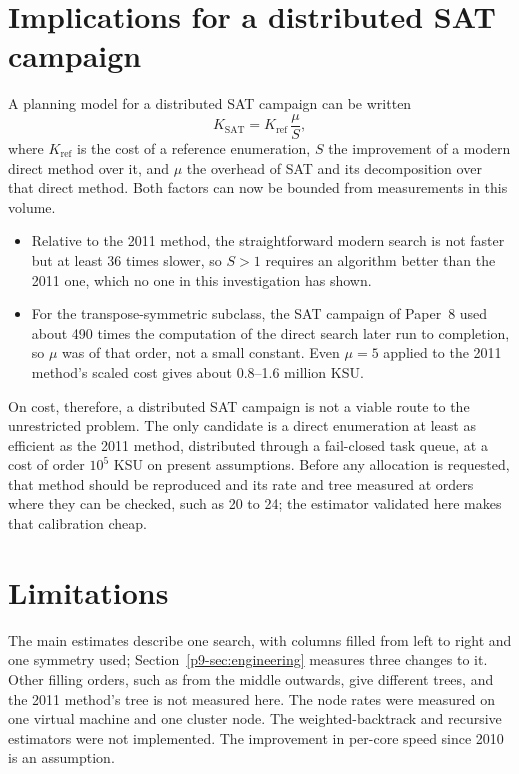 \documentclass[11pt,a4paper,oneside]{report}
\theoremstyle{definition}
\begin{document}
\section{Implications for a distributed SAT campaign}
\label{p9-sec:sat}
A planning model for a distributed SAT campaign can be written
\[
K_{\mathrm{SAT}}=K_{\mathrm{ref}}\,\frac{\mu}{S},
\]
where $K_{\mathrm{ref}}$ is the cost of a reference enumeration, $S$ the improvement of a modern direct
method over it, and $\mu$ the overhead of SAT and its decomposition over that direct method. Both
factors can now be bounded from measurements in this volume.
\begin{itemize}
\item Relative to the 2011 method, the straightforward modern search is not faster but at least 36
times slower, so $S>1$ requires an algorithm better than the 2011 one, which no one in this
investigation has shown.
\item For the transpose-symmetric subclass, the SAT campaign of Paper~8 used about 490 times the
computation of the direct search later run to completion, so $\mu$ was of that order, not a small constant. Even $\mu=5$ applied to
the 2011 method's scaled cost gives about 0.8--1.6 million KSU.
\end{itemize}
On cost, therefore, a distributed SAT campaign is not a viable route to the unrestricted problem. The
only candidate is a direct enumeration at least as efficient as the 2011 method, distributed through a
fail-closed task queue, at a cost of order $10^5$ KSU on present assumptions. Before any allocation is
requested, that method should be reproduced and its rate and tree measured at orders where they can be
checked, such as 20 to 24; the estimator validated here makes that calibration cheap.

\section{Limitations}
\label{p9-sec:limits}
The main estimates describe one search, with columns filled from left to right and one symmetry used;
Section~\ref{p9-sec:engineering} measures three changes to it. Other
filling orders, such as from the middle outwards, give different trees, and the 2011 method's tree is
not measured here. The node rates were measured on one virtual machine and one cluster node. The weighted-backtrack and recursive estimators were not implemented. The improvement in
per-core speed since 2010 is an assumption.
\end{document}
